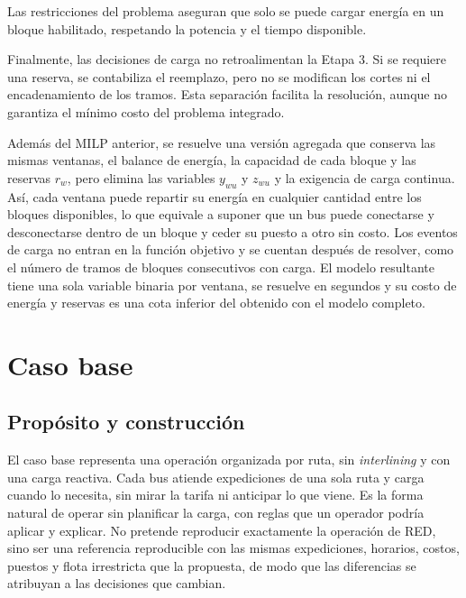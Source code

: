 Las restricciones del problema aseguran que solo se puede cargar energía en un bloque habilitado,
respetando la potencia y el tiempo disponible.


Finalmente, las decisiones de carga no retroalimentan la Etapa 3. Si se
requiere una reserva, se contabiliza
el reemplazo, pero no se modifican los cortes ni el encadenamiento de los
tramos. Esta separación facilita la resolución, aunque no garantiza el mínimo
costo del problema integrado.

Además del MILP anterior, se resuelve una versión agregada que conserva las mismas
ventanas, el balance de energía, la capacidad de cada bloque y las reservas $r_w$,
pero elimina las variables $y_{wu}$ y $z_{wu}$ y la exigencia de carga continua.
Así, cada ventana puede repartir su energía en cualquier cantidad entre los bloques
disponibles, lo que equivale a suponer que un bus puede conectarse y desconectarse
dentro de un bloque y ceder su puesto a otro sin costo. Los eventos de carga no
entran en la función objetivo y se cuentan después de resolver, como el número de
tramos de bloques consecutivos con carga. El modelo resultante tiene una sola
variable binaria por ventana, se resuelve en segundos y su costo de energía y
reservas es una cota inferior del obtenido con el modelo completo.








\section{Caso base}
\label{sec:caso-base}

\subsection{Propósito y construcción}

El caso base representa una operación organizada por ruta, sin \textit{interlining} y con una carga reactiva. Cada bus atiende expediciones de una sola ruta y carga cuando lo necesita, sin mirar la tarifa ni anticipar lo que viene. Es la forma natural de operar sin planificar la carga, con reglas que un operador podría aplicar y explicar. No pretende reproducir exactamente la operación de RED, sino ser una referencia reproducible con las mismas expediciones, horarios, costos, puestos y flota irrestricta que la propuesta, de modo que las diferencias se atribuyan a las decisiones que cambian.

